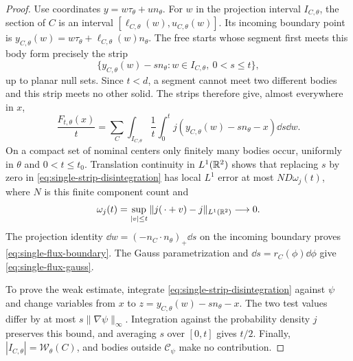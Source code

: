 \begin{proof}
Use coordinates $y=w\tau_\theta+u n_\theta$.  For $w$ in the
projection interval $I_{C,\theta}$, the section of $C$ is an interval
$[\ell_{C,\theta}(w),u_{C,\theta}(w)]$.  Its incoming boundary
point is
$y_{C,\theta}(w)=w\tau_\theta+\ell_{C,\theta}(w)n_\theta$.
The free starts whose segment first meets this body form precisely
the strip
\[
 \{y_{C,\theta}(w)-s n_\theta:
               w\in I_{C,\theta},\ 0<s\le t\},
\]
up to planar null sets.  Since $t<d$, a segment cannot meet two
different bodies and this strip meets no other solid.  The strips
therefore give, almost everywhere in $x$,
\begin{equation}\label{eq:single-strip-disintegration}
 \frac{F_{t,\theta}(x)}t
 =\sum_C\int_{I_{C,\theta}}\frac1t\int_0^t
   j(y_{C,\theta}(w)-s n_\theta-x)\dd s\dd w.
\end{equation}
On a compact set of nominal centers only finitely many bodies occur,
uniformly in $\theta$ and $0<t\le t_0$.  Translation continuity in
$L^1(\mathbb R^2)$ shows that replacing $s$ by zero in
\eqref{eq:single-strip-disintegration} has local $L^1$ error at most
$ND\omega_j(t)$, where $N$ is this finite component count and
\[
 \omega_j(t)=\sup_{|v|\le t}\|j(\,\cdot+v)-j\|_{L^1(\mathbb R^2)}
                         \longrightarrow0.
\]
The projection identity
$\dd w=(-n_C\cdot n_\theta)_+\dd s$ on the incoming boundary
proves \eqref{eq:single-flux-boundary}.  The Gauss parametrization
and $\dd s=r_C(\phi)\dd\phi$ give
\eqref{eq:single-flux-gauss}.

To prove the weak estimate, integrate
\eqref{eq:single-strip-disintegration} against $\psi$ and change
variables from $x$ to $z=y_{C,\theta}(w)-s n_\theta-x$.
The two test values differ by at most
$s\|\nabla\psi\|_\infty$.  Integration against the probability
density $j$ preserves this bound, and averaging $s$ over $[0,t]$
gives $t/2$.  Finally,
$|I_{C,\theta}|=\mathcal W_\theta(C)$, and bodies outside
$\mathcal C_\psi$ make no contribution.
\end{proof}

